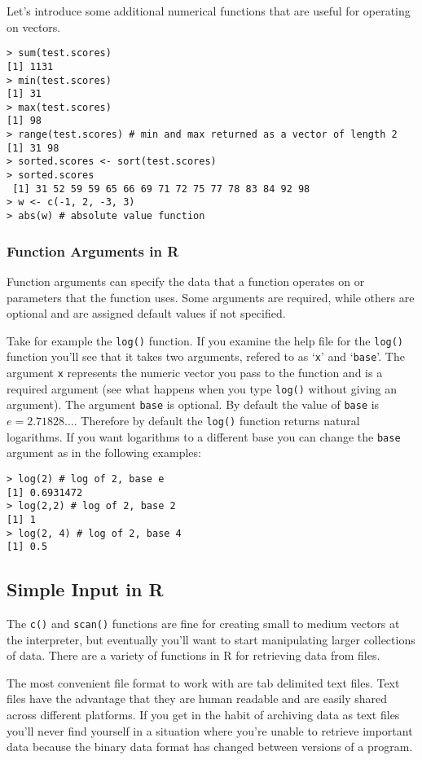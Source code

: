 Let's introduce some additional numerical functions that are useful for
operating on vectors.

\begin{lstlisting}
> sum(test.scores)
[1] 1131
> min(test.scores)
[1] 31
> max(test.scores)
[1] 98
> range(test.scores) # min and max returned as a vector of length 2
[1] 31 98
> sorted.scores <- sort(test.scores)
> sorted.scores
 [1] 31 52 59 59 65 66 69 71 72 75 77 78 83 84 92 98
> w <- c(-1, 2, -3, 3)
> abs(w) # absolute value function
\end{lstlisting}
\subsubsection{Function Arguments in R}

Function arguments can specify the data that a function operates on or
parameters that the function uses. Some arguments are required, while
others are optional and are assigned default values if not specified.

Take for example the \lstinline!log()! function. If you examine the help
file for the \lstinline!log()! function you'll see that it takes two
arguments, refered to as `\lstinline!x!' and `\lstinline!base!'. The
argument \lstinline!x! represents the numeric vector you pass to the
function and is a required argument (see what happens when you type
\lstinline!log()! without giving an argument). The argument
\lstinline!base! is optional. By default the value of \lstinline!base!
is $e = 2.71828\ldots$. Therefore by default the \lstinline!log()!
function returns natural logarithms. If you want logarithms to a
different base you can change the \lstinline!base! argument as in the
following examples:

\begin{lstlisting}
> log(2) # log of 2, base e
[1] 0.6931472
> log(2,2) # log of 2, base 2
[1] 1
> log(2, 4) # log of 2, base 4
[1] 0.5
\end{lstlisting}
\subsection{Simple Input in R}

The \lstinline!c()! and \lstinline!scan()! functions are fine for
creating small to medium vectors at the interpreter, but eventually
you'll want to start manipulating larger collections of data. There are
a variety of functions in R for retrieving data from files.

The most convenient file format to work with are tab delimited text
files. Text files have the advantage that they are human readable and
are easily shared across different platforms. If you get in the habit of
archiving data as text files you'll never find yourself in a situation
where you're unable to retrieve important data because the binary data
format has changed between versions of a program.

